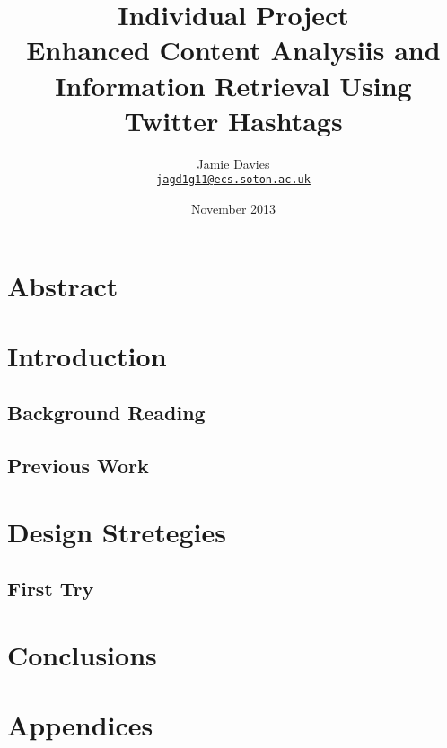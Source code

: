 \documentclass[a4paper,12pt]{report}
\title{
    \large{Individual Project}\\
    \Huge{Enhanced Content Analysiis and Information Retrieval Using Twitter Hashtags}
}
\author{
    Jamie Davies\\
    \href{mailto:jagd1g11@ecs.soton.ac.uk}{\nolinkurl{jagd1g11@ecs.soton.ac.uk}}
}
\date{November 2013}
\begin{document}
\maketitle

\section{Abstract}

\tableofcontents

\section{Introduction}
\subsection{Background Reading}
\subsection{Previous Work}

\section{Design Stretegies}
\subsection{First Try}

\section{Conclusions}


{\footnotesize }

\section{Appendices}
\end{document}
